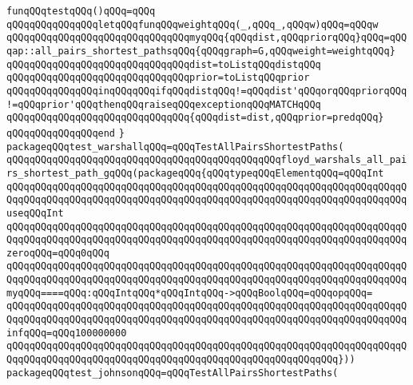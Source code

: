 \newline
\verb|funqQQqtestqQQq()qQQq=qQQq|\newline
\verb|qQQqqQQqqQQqqQQqletqQQqfunqQQqweightqQQq(_,qQQq_,qQQqw)qQQq=qQQqw|\newline
\verb|qQQqqQQqqQQqqQQqqQQqqQQqqQQqqQQqmyqQQq{qQQqdist,qQQqpriorqQQq}qQQq=qQQqap::all_pairs_shortest_pathsqQQq{qQQqgraph=G,qQQqweight=weightqQQq}|\newline
\verb|qQQqqQQqqQQqqQQqqQQqqQQqqQQqqQQqdist=toListqQQqdistqQQq|\newline
\verb|qQQqqQQqqQQqqQQqqQQqqQQqqQQqqQQqprior=toListqQQqprior|\newline
\verb|qQQqqQQqqQQqqQQqinqQQqqQQqifqQQqdistqQQq!=qQQqdist'qQQqorqQQqpriorqQQq!=qQQqprior'qQQqthenqQQqraiseqQQqexceptionqQQqMATCHqQQq|\newline
\verb|qQQqqQQqqQQqqQQqqQQqqQQqqQQqqQQq{qQQqdist=dist,qQQqprior=predqQQq}|\newline
\verb|qQQqqQQqqQQqqQQqend|\newline
\newline
\verb|}|\newline
\newline
\verb|packageqQQqtest_warshallqQQq=qQQqTestAllPairsShortestPaths(|\newline
\verb|qQQqqQQqqQQqqQQqqQQqqQQqqQQqqQQqqQQqqQQqqQQqqQQqfloyd_warshals_all_pairs_shortest_path_gqQQq(packageqQQq{qQQqtypeqQQqElementqQQq=qQQqInt|\newline
\verb|qQQqqQQqqQQqqQQqqQQqqQQqqQQqqQQqqQQqqQQqqQQqqQQqqQQqqQQqqQQqqQQqqQQqqQQqqQQqqQQqqQQqqQQqqQQqqQQqqQQqqQQqqQQqqQQqqQQqqQQqqQQqqQQqqQQqqQQqqQQquseqQQqInt|\newline
\verb|qQQqqQQqqQQqqQQqqQQqqQQqqQQqqQQqqQQqqQQqqQQqqQQqqQQqqQQqqQQqqQQqqQQqqQQqqQQqqQQqqQQqqQQqqQQqqQQqqQQqqQQqqQQqqQQqqQQqqQQqqQQqqQQqqQQqqQQqqQQqzeroqQQq=qQQq0qQQq|\newline
\verb|qQQqqQQqqQQqqQQqqQQqqQQqqQQqqQQqqQQqqQQqqQQqqQQqqQQqqQQqqQQqqQQqqQQqqQQqqQQqqQQqqQQqqQQqqQQqqQQqqQQqqQQqqQQqqQQqqQQqqQQqqQQqqQQqqQQqqQQqqQQqmyqQQq====qQQq:qQQqIntqQQq*qQQqIntqQQq->qQQqBoolqQQq=qQQqopqQQq=|\newline
\verb|qQQqqQQqqQQqqQQqqQQqqQQqqQQqqQQqqQQqqQQqqQQqqQQqqQQqqQQqqQQqqQQqqQQqqQQqqQQqqQQqqQQqqQQqqQQqqQQqqQQqqQQqqQQqqQQqqQQqqQQqqQQqqQQqqQQqqQQqqQQqinfqQQq=qQQq100000000|\newline
\verb|qQQqqQQqqQQqqQQqqQQqqQQqqQQqqQQqqQQqqQQqqQQqqQQqqQQqqQQqqQQqqQQqqQQqqQQqqQQqqQQqqQQqqQQqqQQqqQQqqQQqqQQqqQQqqQQqqQQqqQQqqQQqqQQq}))|\newline
\verb|packageqQQqtest_johnsonqQQq=qQQqTestAllPairsShortestPaths(|\newline
